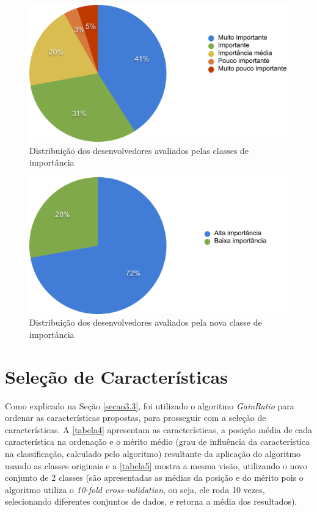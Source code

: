 \begin{figure}[h]
	\centering
	\includegraphics[scale=0.45]{figs/geral/imagem-classe-original}
	\caption{\label{fig_3}Distribuição dos desenvolvedores avaliados pelas classes de importância}
\end{figure}

\begin{figure}[h]
	\centering
	\includegraphics[scale=0.45]{figs/geral/imagem-classe-alternativa}
	\caption{\label{fig_4}Distribuição dos desenvolvedores avaliados pela nova classe de importância}
\end{figure}

\section{Seleção de Características}\label{secao4.3}

Como explicado na Seção \ref{secao3.3}, foi utilizado o algoritmo \textit{GainRatio} para ordenar as características propostas, para prosseguir com a seleção de características. A \autoref{tabela4} apresentam as características, a posição média de cada característica na ordenação e o mérito médio (grau de influência da característica na classificação, calculado pelo algoritmo) resultante da aplicação do algoritmo usando as classes originais e a \autoref{tabela5} mostra a mesma visão, utilizando o novo conjunto de 2 classes (são apresentadas as médias da posição e do mérito pois o algoritmo utiliza o \textit{10-fold cross-validation}, ou seja, ele roda 10 vezes, selecionando diferentes conjuntos de dados, e retorna a média dos resultados).

